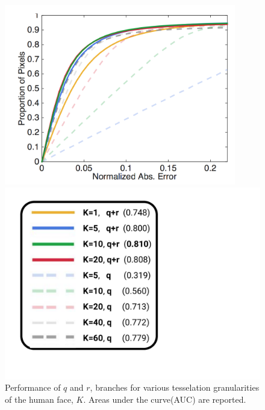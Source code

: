 \begin{figure}[t]
    \centering
    \begin{minipage}{.7\linewidth}
        \centering
        \includegraphics[trim={0.5cm 0.5cm 0.7cm 0.5cm},clip,width=0.9\textwidth]{resources/Human_Poses/Errorlar}
    \end{minipage}%
    \begin{minipage}{0.3\linewidth}
        \centering
        \includegraphics[trim={1.5cm 1cm 10cm 1cm},clip,width=1\textwidth]{resources/Human_Poses/Labels5-3}
    \end{minipage}
    \caption{Performance of $q$ and $r$, branches for various tesselation granularities of the human face, $K$. Areas under the curve(AUC) are reported.}
    \label{fig:exp}

\end{figure}


